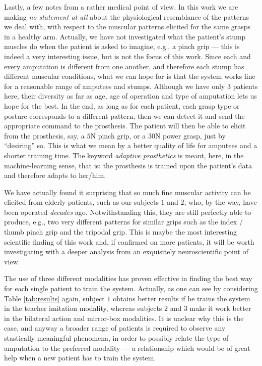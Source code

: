 Lastly, a few notes from a rather medical point of view. In this work
we are making \emph{no statement at all} about the physiological
resemblance of the patterns we deal with, with respect to the muscular
patterns elicited for the same grasps in a healthy arm. Actually, we
have not investigated what the patient's stump muscles do when the
patient is asked to imagine, e.g., a pinch grip --- this is indeed a
very interesting issue, but is not the focus of this work. Since each
and every amputation is different from one another, and therefore each
stump has different muscular conditions, what we can hope for is that
the system works fine for a reasonable range of amputees and
stumps. Although we have only $3$ patients here, their diversity as
far as age, age of operation and type of amputation lets us hope for
the best. In the end, as long as for each patient, each grasp type or
posture corresponds to a different pattern, then we can detect it and
send the appropriate command to the prosthesis. The patient will then
be able to elicit from the prosthesis, say, a $5$N pinch grip, or a
$30$N power grasp, just by ``desiring'' so. This is what we mean by a
better quality of life for amputees and a shorter training time. The
keyword \emph{adaptive prosthetics} is meant, here, in the
machine-learning sense, that is: the prosthesis is trained upon the
patient's data and therefore adapts to her/him.

We have actually found it surprising that so much fine muscular
activity can be elicited from elderly patients, such as our subjects
$1$ and $2$, who, by the way, have been operated \emph{decades}
ago. Notwithstanding this, they are still perfectly able to produce,
e.g., two very different patterns for similar grips such as the index
/ thumb pinch grip and the tripodal grip. This is maybe the most
interesting scientific finding of this work and, if confirmed on more
patients, it will be worth investigating with a deeper analysis from
an exquisitely neuroscientific point of view.

The use of three different modalities has proven effective in finding
the best way for each single patient to train the system. Actually, as
one can see by considering Table \ref{tab:results} again, subject $1$
obtains better results if he trains the system in the teacher
imitation modality, whereas subjects $2$ and $3$ make it work better
in the bilateral action and mirror-box modalities. It is unclear why
this is the case, and anyway a broader range of patients is required
to observe any stastically meaningful phenomena, in order to possibly
relate the type of amputation to the preferred modality --- a
relationship which would be of great help when a new patient has to
train the system.

